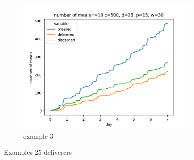 \begin{center}
\begin{figure}
        \hfill
        \begin{subfigure}[m]{0.30\textwidth}
            \centering
            \includegraphics[width=\textwidth]{sections/run1/week_nd_3_food_ordering_distribution_500_10_25_30}
            \caption{example 3}
        \end{subfigure}
        \caption{Examples 25 deliverers}
        \label{fig:examples 25 deliverers}
    \end{figure}
\end{center}
